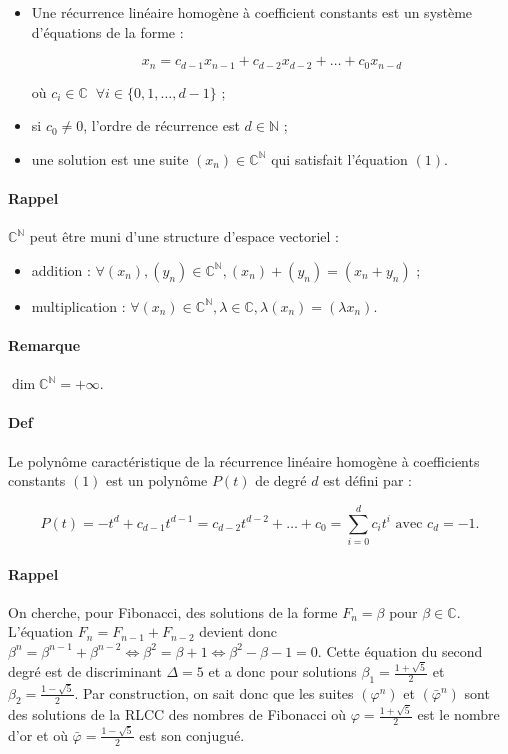 \documentclass{article}
\newenvironment{lst}
	{\begin{minipage}[t]{.9\linewidth}\begin{itemize}}
	{\end{itemize}\end{minipage}}
\begin{document}
			\begin{lst}
				\item Une récurrence linéaire homogène à coefficient constants est un système d'équations de la forme :

					  \begin{equation}\label{eq:RLCCH}
					  	x_n = c_{d-1}x_{n-1} + c_{d-2}x_{d-2} + \ldots + c_0x_{n-d}
					  \end{equation}

					  où $c_i \in \mathbb C\;\;\forall i \in \{0, 1, \ldots, d-1\}$ ;
				\item si $c_0 \neq 0$, l'ordre de récurrence est $d \in \mathbb N$ ;
				\item une solution est une suite $(x_n) \in \mathbb C^{\mathbb N}$ qui satisfait l'équation $(1)$.
			\end{lst}

			\paragraph{Rappel} $\mathbb C^{\mathbb N}$ peut être muni d'une structure d'espace vectoriel :
			\begin{itemize}
				\item addition : $\forall (x_n), (y_n) \in \mathbb C^{\mathbb N}, (x_n) + (y_n) = (x_n + y_n)$ ;
				\item multiplication : $\forall (x_n) \in \mathbb C^{\mathbb N}, \lambda \in \mathbb C, \lambda(x_n) = (\lambda x_n)$.
			\end{itemize}

			\paragraph{Remarque} $\dim \mathbb C^{\mathbb N} = +\infty$.

			\paragraph{Def} Le polynôme caractéristique de la récurrence linéaire homogène à coefficients constants $(1)$ est un polynôme $P(t)$ de degré $d$ est défini par :

			\[P(t) = -t^d + c_{d-1}t^{d-1} = c_{d-2}t^{d-2} + \ldots + c_0 = \sum_{i=0}^dc_it^i \text{ avec $c_d = -1$}.\]

			\paragraph{Rappel} On cherche, pour Fibonacci, des solutions de la forme $F_n = \beta$ pour $\beta \in \mathbb C$. L'équation
			$F_n = F_{n-1} + F_{n-2}$ devient donc $\beta^n = \beta^{n-1} + \beta^{n-2} \iff \beta^2 = \beta + 1 \iff \beta^2 - \beta - 1 = 0$.
			Cette équation du second degré est de discriminant $\Delta = 5$ et a donc pour solutions $\beta_1 = \frac {1 + \sqrt 5}2$ et $\beta_2 = \frac {1 - \sqrt 5}2$.
			Par construction, on sait donc que les suites $(\varphi^n)$ et $(\bar\varphi^n)$ sont des solutions de la RLCC des nombres de Fibonacci où $\varphi = \frac {1 + \sqrt 5}2$ est
			le nombre d'or et où $\bar\varphi = \frac {1-\sqrt 5}2$ est son conjugué.
\end{document}

